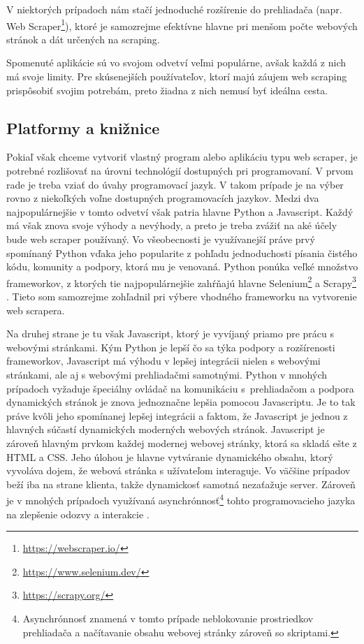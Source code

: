 V niektorých prípadoch nám stačí jednoduché rozšírenie do prehliadača (napr. Web Scraper\footnote{\url{https://webscraper.io/}}), ktoré je samozrejme efektívne hlavne pri menšom počte webových stránok a dát určených na scraping. 

Spomenuté aplikácie sú vo svojom odvetví veľmi populárne, avšak každá z nich má svoje limity. Pre skúsenejších používateľov, ktorí majú záujem web scraping prispôsobiť svojim potrebám, preto žiadna z nich nemusí byť ideálna cesta.

\subsection{Platformy a knižnice}

Pokiaľ však chceme vytvoriť vlastný program alebo aplikáciu typu web scraper, je potrebné rozlišovať na úrovni technológií dostupných pri programovaní. V prvom rade je treba vziať do úvahy programovací jazyk. V takom prípade je na výber rovno z niekoľkých voľne dostupných programovacích jazykov. Medzi dva najpopulárnejšie v tomto odvetví však patria hlavne Python a Javascript. Každý má však znova svoje výhody a nevýhody, a preto je treba zvážiť na aké účely bude web scraper používaný. Vo všeobecnosti je využívanejší práve prvý spomínaný Python vďaka jeho popularite z pohľadu jednoduchosti písania čistého kódu, komunity a podpory, ktorá mu je venovaná. Python ponúka veľké množstvo frameworkov, z ktorých tie najpopulárnejšie zahŕňajú hlavne Selenium\footnote{\url{https://www.selenium.dev/}} a Scrapy\footnote{\url{https://scrapy.org/}} \cite{The5Best}. Tieto som samozrejme zohľadnil pri výbere vhodného frameworku na vytvorenie web scrapera.

Na druhej strane je tu však Javascript, ktorý je vyvíjaný priamo pre prácu s webovými stránkami. Kým Python je lepší čo sa týka podpory a rozšírenosti frameworkov, Javascript má výhodu v lepšej integrácii nielen s webovými stránkami, ale aj s webovými prehliadačmi samotnými. Python v mnohých prípadoch vyžaduje špeciálny ovládač na komunikáciu s~prehliadačom a podpora dynamických stránok je znova jednoznačne lepšia pomocou Javascriptu. Je to tak práve kvôli jeho spomínanej lepšej integrácii a faktom, že Javascript je jednou z hlavných súčastí dynamických moderných webových stránok. Javascript je zároveň hlavným prvkom každej modernej webovej stránky, ktorá sa skladá ešte z HTML a CSS. Jeho úlohou je hlavne vytváranie dynamického obsahu, ktorý vyvoláva dojem, že webová stránka s užívateľom interaguje. Vo väčšine prípadov beží iba na strane klienta, takže dynamickosť samotná nezaťažuje server. Zároveň je v mnohých prípadoch využívaná asynchrónnosť\footnote{Asynchrónnosť znamená v tomto prípade neblokovanie prostriedkov prehliadača a načítavanie obsahu webovej stránky zároveň so skriptami.} tohto programovacieho jazyka na zlepšenie odozvy a interakcie \cite{Javascript}. 

